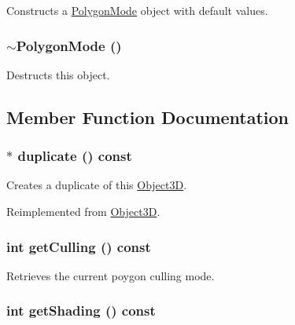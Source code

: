 Constructs a \hyperlink{classm3g_1_1PolygonMode}{PolygonMode} object with default values. \hypertarget{classm3g_1_1PolygonMode_64ea3958d7ec67fc648707782b2221fe}{
\subsubsection[{$\sim$PolygonMode}]{\setlength{\rightskip}{0pt plus 5cm}$\sim${\bf PolygonMode} ()}}
\label{classm3g_1_1PolygonMode_64ea3958d7ec67fc648707782b2221fe}


Destructs this object. 

\subsection{Member Function Documentation}
\hypertarget{classm3g_1_1PolygonMode_a302cb097523e044bc03198ec8448c32}{
\subsubsection[{duplicate}]{ $\ast$ duplicate () const}}
\label{classm3g_1_1PolygonMode_a302cb097523e044bc03198ec8448c32}


Creates a duplicate of this \hyperlink{classm3g_1_1Object3D}{Object3D}. 

Reimplemented from \hyperlink{classm3g_1_1Object3D_a25110dac934f867b83b73ad4741a0f4}{Object3D}.\hypertarget{classm3g_1_1PolygonMode_3b0c0325e93774222d828f2612d59b1b}{
\subsubsection[{getCulling}]{\setlength{\rightskip}{0pt plus 5cm}int getCulling () const}}
\label{classm3g_1_1PolygonMode_3b0c0325e93774222d828f2612d59b1b}


Retrieves the current poygon culling mode. \hypertarget{classm3g_1_1PolygonMode_c09a62f099e07df16a8c21f997b9f6a6}{
\subsubsection[{getShading}]{\setlength{\rightskip}{0pt plus 5cm}int getShading () const}}
\label{classm3g_1_1PolygonMode_c09a62f099e07df16a8c21f997b9f6a6}


